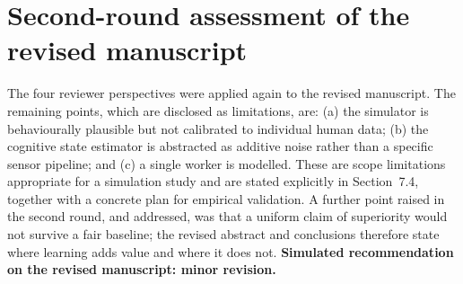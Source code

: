 \documentclass[11pt]{article}
\begin{document}
\section{Second-round assessment of the revised manuscript}
The four reviewer perspectives were applied again to the revised manuscript. The remaining points, which are disclosed as limitations, are: (a) the simulator is behaviourally plausible but not calibrated to individual human data; (b) the cognitive state estimator is abstracted as additive noise rather than a specific sensor pipeline; and (c) a single worker is modelled. These are scope limitations appropriate for a simulation study and are stated explicitly in Section~7.4, together with a concrete plan for empirical validation. A further point raised in the second round, and addressed, was that a uniform claim of superiority would not survive a fair baseline; the revised abstract and conclusions therefore state where learning adds value and where it does not. \textbf{Simulated recommendation on the revised manuscript: minor revision.}
\end{document}
